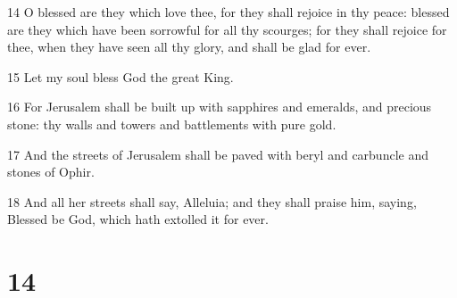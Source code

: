 \par 14 O blessed are they which love thee, for they shall rejoice in thy peace: blessed are they which have been sorrowful for all thy scourges; for they shall rejoice for thee, when they have seen all thy glory, and shall be glad for ever.
\par 15 Let my soul bless God the great King.
\par 16 For Jerusalem shall be built up with sapphires and emeralds, and precious stone: thy walls and towers and battlements with pure gold.
\par 17 And the streets of Jerusalem shall be paved with beryl and carbuncle and stones of Ophir.
\par 18 And all her streets shall say, Alleluia; and they shall praise him, saying, Blessed be God, which hath extolled it for ever.

\chapter{14}

